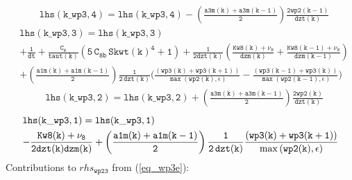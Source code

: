 \documentclass[11pt,fleqn]{article}
\begin{document}
%
\begin{equation}
\begin{split}
& \mathtt{ lhs(k\_wp3,4) = lhs(k\_wp3,4) 
  - \left(\frac{a3m(k)+a3m(k-1)}{2}\right) \frac{2 wp2(k-1)}{dzt(k)}
  }
\end{split}
\end{equation}
%
\begin{equation}
\begin{split}
& \mathtt{ lhs(k\_wp3,3) = lhs(k\_wp3,3) }\\
& \mathtt{
+ \frac{1}{dt}
+ \frac{C_8}{taut(k)}
   \left(  5 \, C_{8b} \, {Skwt(k)}^4 + 1 \right)
+ \frac{1}{2 dzt(k)} \left(  \frac{Kw8(k)+\nu_8}{dzm(k)}
                           + \frac{Kw8(k-1)+\nu_8}{dzm(k-1)} \right)
} \\
& \mathtt{
+ \left(\frac{a1m(k)+a1m(k-1)}{2}\right) \frac{1}{2 \, dzt(k)}
  \bigg(
    \frac{ \left(wp3(k)+wp3(k+1)\right) }
         { \max\left( wp2(k), \epsilon \right) }
  - \frac{ \left(wp3(k-1)+wp3(k)\right) }
         { \max\left( wp2(k-1), \epsilon \right) }
  \bigg)
}
\end{split}
\end{equation}
%
\begin{equation}
\begin{split}
& \mathtt{ lhs(k\_wp3,2) = lhs(k\_wp3,2)
  + \left(\frac{a3m(k)+a3m(k-1)}{2}\right) \frac{2 wp2(k)}{dzt(k)}
  }
\end{split}
\end{equation}
%
\begin{equation}
\begin{split}
& \mathtt{ lhs(k\_wp3,1) = lhs(k\_wp3,1) }\\
& \mathtt{
- \frac{Kw8(k)+\nu_8}{2 dzt(k)dzm(k)}
+ \left(\frac{a1m(k)+a1m(k-1)}{2}\right) \frac{1}{2 \, dzt(k)}
  \frac{ \left(wp3(k)+wp3(k+1)\right) }
       { \max\left( wp2(k), \epsilon \right) }
}
\end{split}
\end{equation}
%
Contributions to $rhs_{\mathtt{wp23}}$ from (\ref{eq_wp3e}):
%
\end{document}
